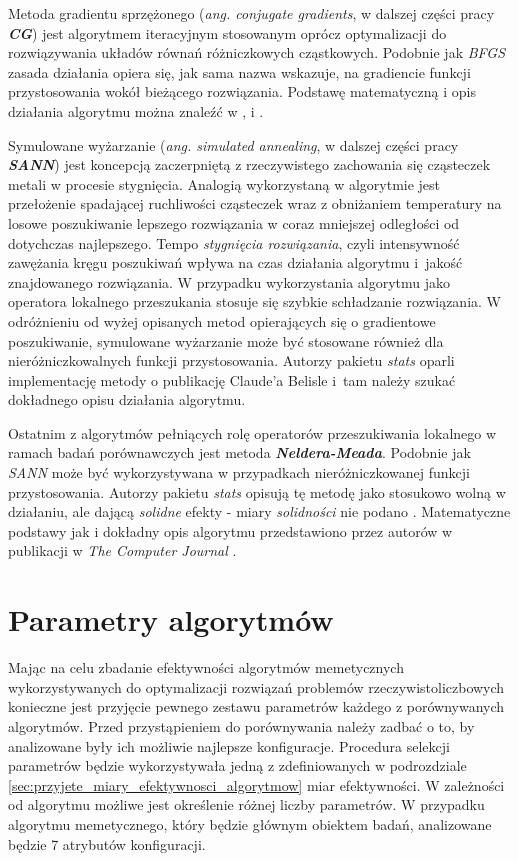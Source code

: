 \par
Metoda gradientu sprzężonego (\emph{ang. conjugate gradients}, w dalszej części pracy \emph{\textbf{CG}}) jest algorytmem iteracyjnym stosowanym oprócz optymalizacji do rozwiązywania układów równań różniczkowych cząstkowych. Podobnie jak \emph{BFGS} zasada działania opiera się, jak sama nazwa wskazuje, na gradiencie funkcji przystosowania wokół bieżącego rozwiązania. Podstawę matematyczną i opis działania algorytmu można znaleźć w \cite{fletcher1964function}, \cite{Nash90a} i \cite{nocedal2006numerical}.
\par
Symulowane wyżarzanie (\emph{ang. simulated annealing}, w dalszej części pracy \emph{\textbf{SANN}}) jest koncepcją zaczerpniętą z rzeczywistego zachowania się cząsteczek metali w procesie stygnięcia. Analogią wykorzystaną w algorytmie jest przełożenie spadającej ruchliwości cząsteczek wraz z obniżaniem temperatury na losowe poszukiwanie lepszego rozwiązania w coraz mniejszej odległości od dotychczas najlepszego. Tempo \emph{stygnięcia rozwiązania}, czyli intensywność zawężania kręgu poszukiwań wpływa na czas działania algorytmu i~jakość znajdowanego rozwiązania. W przypadku wykorzystania algorytmu jako operatora lokalnego przeszukania stosuje się szybkie schładzanie rozwiązania. W odróżnieniu od wyżej opisanych metod opierających się o gradientowe poszukiwanie, symulowane wyżarzanie może być stosowane również dla nieróżniczkowalnych funkcji przystosowania. Autorzy pakietu \emph{stats} oparli implementację metody o publikację Claude'a Belisle \cite{belisle1992convergence} i~tam należy szukać dokładnego opisu działania algorytmu.
\par
Ostatnim z algorytmów pełniących rolę operatorów przeszukiwania lokalnego w ramach  badań porównawczych jest metoda \emph{\textbf{Neldera-Meada}}. Podobnie jak \emph{SANN} może być wykorzystywana w przypadkach nieróżniczkowanej funkcji przystosowania. Autorzy pakietu \emph{stats} opisują tę metodę jako stosukowo wolną w działaniu, ale dającą \emph{solidne} efekty - miary \emph{solidności} nie podano \cite{statsPackage}. Matematyczne podstawy jak i dokładny opis algorytmu przedstawiono przez autorów w publikacji w \emph{The Computer Journal} \cite{nelderMead1965}.


\section{Parametry algorytmów}
\label{sec:parametry_algorytmow}
\par
Mając na celu zbadanie efektywności algorytmów memetycznych wykorzystywanych do optymalizacji rozwiązań problemów rzeczywistoliczbowych konieczne jest przyjęcie pewnego zestawu parametrów każdego z porównywanych algorytmów. Przed przystąpieniem do porównywania należy zadbać o to, by analizowane były ich możliwie najlepsze konfiguracje. Procedura selekcji parametrów będzie wykorzystywała jedną z zdefiniowanych w podrozdziale \ref{sec:przyjete_miary_efektywnosci_algorytmow} miar efektywności. W zależności od algorytmu możliwe jest określenie różnej liczby parametrów. W przypadku algorytmu memetycznego, który będzie głównym obiektem badań, analizowane będzie 7 atrybutów konfiguracji.
